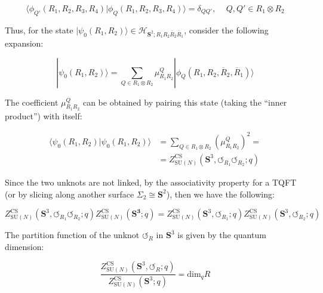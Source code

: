 \documentclass[a4paper,titlepage,twoside]{book}
\begin{document}
\begin{equation}
  \langle \phi_{Q'}{ (R_1, R_2, R_3, R_4) } | \phi_Q{ (R_1, R_2, R_3, R_4)} \rangle = \delta_{QQ'}, \quad \, Q,Q' \in R_1 \otimes R_2
\end{equation}

Thus, for the state $|\psi_0(R_1,R_2)\rangle \in \mathcal{H}_{\mathbf{S}^2; R_1R_2 \overline{R}_2 \overline{R}_1}$, consider the following expansion:

\begin{equation}
  |\psi_0{ (R_1,R_2) } \rangle = \sum_{Q \in R_1 \otimes R_2} \mu^Q_{R_1R_2} | \phi_Q{ (R_1, R_2, \overline{R}_2,\overline{R}_1 ) }\rangle
\end{equation}

The coefficient $\mu^Q_{R_1R_2}$ can be obtained by pairing this state (taking the ``inner product'') with itself:

\begin{equation}
\begin{aligned}
  \langle \psi_0{(R_1,R_2)} |\psi_0{ (R_1,R_2)}\rangle & = \sum_{ Q \in R_1\otimes R_2} \left( \mu^Q_{R_1R_2} \right)^2 = \\
  & = Z^{\text{CS}}_{ \text{SU}{(N)} }{ ( \mathbf{S}^3, \circlearrowleft_{R_1} \circlearrowleft_{R_2}; q)}
\end{aligned}
\end{equation}

Since the two unknots are not linked, by the associativity property for a TQFT (or by slicing along another surface $\Sigma_2 \cong \mathbf{S}^2$), then we have the following:

\begin{equation}
  Z^{ \text{CS}}_{ \text{SU}{(N)}}{ (\mathbf{S}^3, \circlearrowleft_{R_1} \circlearrowleft_{R_2};q ) } Z^{ \text{CS}}_{ \text{SU}{ (N)} }{ (\mathbf{S^3};q) } = Z^{\text{CS}}_{ \text{SU}{(N)} }{ ( \mathbf{S}^3, \circlearrowleft_{R_1}; q) } Z^{\text{CS}}_{ \text{SU}{ (N)}}{ (\mathbf{S}^3, \circlearrowleft_{R_2};q)}
\end{equation}

The partition function of the unknot $\circlearrowleft_R$ in $\mathbf{S}^3$ is given by the quantum dimension:

\begin{equation}
  \frac{ Z^{\text{CS}}_{ \text{SU}{ (N) }}{ ( \mathbf{S}^3, \circlearrowleft_R;q) } }{ Z^{ \text{CS}}_{ \text{SU}{(N)} }{ (\mathbf{S}^3;q) } } = \text{dim}_q{ R}
\end{equation}
\end{document}
